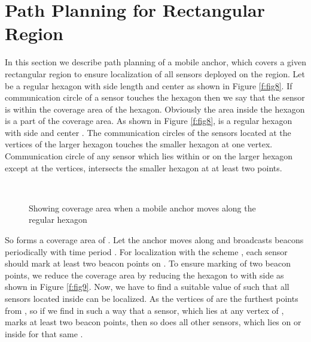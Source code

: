 \documentclass[preprint,11pt]{elsarticle}
\begin{document}
\section{Path Planning for Rectangular Region}
\label{sec:tech2}
In this section we describe path planning of a mobile anchor, which covers a given rectangular region to ensure localization of all sensors deployed
on the region. Let  be a regular hexagon with side length  and center  as shown in  Figure \ref{f:fig8}.
If communication circle of a sensor touches the hexagon then we say that the sensor is within the coverage area of the hexagon.
Obviously the area inside the hexagon is a part of the coverage area.  As shown in Figure \ref{f:fig8},  is a regular hexagon with side  and center . The communication circles of the sensors located at the vertices of the larger hexagon touches the smaller hexagon at one vertex. Communication circle of any sensor which lies within or on the larger hexagon except at the vertices, intersects the smaller hexagon at at least two points.
\begin{figure}[h]
  \centering
     ~~~~~~~~~
\caption{Showing coverage area when a mobile anchor moves along the regular hexagon }
\end{figure}
So  forms a coverage area of .
Let the anchor moves along  and broadcasts beacons periodically with time period . For localization with the scheme \cite{Lee2009}, each sensor should mark at least two beacon points on . To ensure marking of two beacon points, we reduce the coverage area by reducing the hexagon  to  with side  as shown in  Figure \ref{f:fig9}. Now, we have to find a suitable value of  such that all sensors located inside  can be localized.
As the vertices of  are the furthest points from , so if we find  in such a way that a sensor, which lies at any vertex of , marks at least two beacon points, then so does all other sensors, which lies on or inside  for that same .
\end{document}
